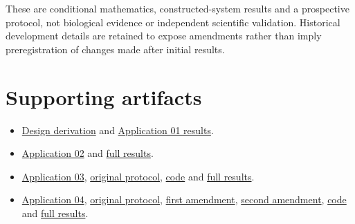 \documentclass[
  american,
  11pt,
  letterpaper,
]{article}
\providecommand{\tightlist}{%
  \setlength{\itemsep}{0pt}\setlength{\parskip}{0pt}}
\begin{document}
These are conditional mathematics, constructed-system results and a prospective protocol, not biological evidence or independent scientific validation. Historical development details are retained to expose amendments rather than imply preregistration of changes made after initial results.

\par\ifdim\dimexpr\pagegoal-\pagetotal\relax<135pt\newpage\fi
\section{Supporting artifacts}\label{supporting-artifacts}

\begin{itemize}
\tightlist
\item
  \href{https://github.com/v5ma/v5ma.github.io/blob/master/papers/companions/learning-to-feel-v1.0/ARTIFACT-AVAILABILITY.md#artifact-10}{Design derivation} and \href{https://github.com/v5ma/v5ma.github.io/blob/master/papers/companions/learning-to-feel-v1.0/analysis/phase-learning-design-results.json}{Application 01 results}.
\item
  \href{https://github.com/v5ma/v5ma.github.io/blob/master/papers/companions/learning-to-feel-v1.0/ARTIFACT-AVAILABILITY.md#artifact-2}{Application 02} and \href{https://github.com/v5ma/v5ma.github.io/blob/master/papers/companions/learning-to-feel-v1.0/analysis/receiver-level-inference-results.json}{full results}.
\item
  \href{https://github.com/v5ma/v5ma.github.io/blob/master/papers/companions/learning-to-feel-v1.0/ARTIFACT-AVAILABILITY.md#artifact-3}{Application 03}, \href{https://github.com/v5ma/v5ma.github.io/blob/master/papers/companions/learning-to-feel-v1.0/ARTIFACT-AVAILABILITY.md#artifact-4}{original protocol}, \href{https://github.com/v5ma/v5ma.github.io/blob/master/papers/companions/learning-to-feel-v1.0/analysis/learned-receiver-application.mjs}{code} and \href{https://github.com/v5ma/v5ma.github.io/blob/master/papers/companions/learning-to-feel-v1.0/analysis/learned-receiver-results.json}{full results}.
\item
  \href{https://github.com/v5ma/v5ma.github.io/blob/master/papers/companions/learning-to-feel-v1.0/ARTIFACT-AVAILABILITY.md#artifact-8}{Application 04}, \href{https://github.com/v5ma/v5ma.github.io/blob/master/papers/companions/learning-to-feel-v1.0/ARTIFACT-AVAILABILITY.md#artifact-7}{original protocol}, \href{https://github.com/v5ma/v5ma.github.io/blob/master/papers/companions/learning-to-feel-v1.0/ARTIFACT-AVAILABILITY.md#artifact-5}{first amendment}, \href{https://github.com/v5ma/v5ma.github.io/blob/master/papers/companions/learning-to-feel-v1.0/ARTIFACT-AVAILABILITY.md#artifact-6}{second amendment}, \href{https://github.com/v5ma/v5ma.github.io/blob/master/papers/companions/learning-to-feel-v1.0/analysis/reciprocal-reconstruction.mjs}{code} and \href{https://github.com/v5ma/v5ma.github.io/blob/master/papers/companions/learning-to-feel-v1.0/analysis/reciprocal-reconstruction-results.json}{full results}.

\end{itemize}
\end{document}
